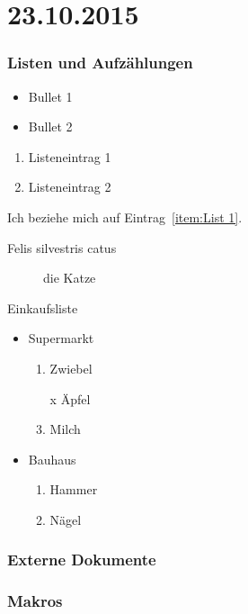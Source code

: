 \documentclass[a4paper]{article}
\begin{document}
\newpage
\part{23.10.2015}

\section{Listen und Aufzählungen}

\begin{itemize}
\item Bullet 1
\item Bullet 2
\end{itemize}

\begin{enumerate}
\item Listeneintrag 1
\item Listeneintrag 2\label{item:List 1}
\end{enumerate}

Ich beziehe mich auf Eintrag~\ref{item:List 1}.

\begin{description}
\item[Felis silvestris catus] die Katze
\end{description}

Einkaufsliste
\begin{itemize}
\item Supermarkt
\begin{enumerate}
\item Zwiebel
\item[x] Äpfel
\item Milch
\end{enumerate}
\item Bauhaus
\begin{enumerate}
\item Hammer
\item Nägel
\end{enumerate}
\end{itemize}

\section{Externe Dokumente}



\section{Makros}
\end{document}
